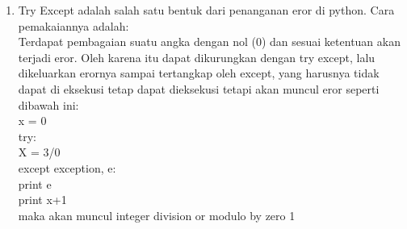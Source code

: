 \begin{enumerate}
	\item Try Except adalah salah satu bentuk dari penanganan eror di python. Cara pemakaiannya adalah:\\
	Terdapat pembagaian suatu angka dengan nol (0) dan sesuai ketentuan akan terjadi eror. Oleh karena 			itu dapat dikurungkan dengan try except, lalu dikeluarkan erornya sampai tertangkap oleh except, yang 	harusnya tidak dapat di eksekusi tetap dapat dieksekusi tetapi akan muncul eror seperti dibawah ini:\\
	x = 0\\
	try:\\
  	  X = 3/0\\
	except exception, e:\\
  	  print e \\

	print x+1\\
	maka akan muncul integer division or modulo by zero 1 \\


\end{enumerate}
